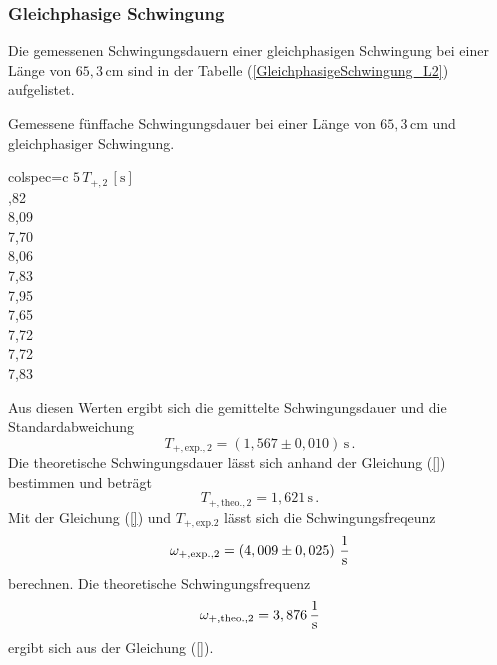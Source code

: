\subsubsection{Gleichphasige Schwingung}
\label{sec:GleichphasigeSchwingung_LangesPendel}
Die gemessenen Schwingungsdauern einer gleichphasigen Schwingung bei einer Länge von $65,3\, \unit{\centi\meter}$ sind in der Tabelle (\ref{GleichphasigeSchwingung_L2})
aufgelistet. 
\begin{table}[H]
  \centering
  \caption{Gemessene fünffache Schwingungsdauer bei einer Länge von $65,3\, \unit{\centi\meter}$ und gleichphasiger Schwingung.}
  \label{tab:GleichphasigeSchwingung_L2}
  \begin{tblr}{colspec={c}}
      \toprule
      $5\, T_{+, 2}\,\left[\unit{\second}\right]$\\
      ,82 \\
      8,09 \\
      7,70 \\
      8,06 \\
      7,83 \\
      7,95 \\
      7,65 \\
      7,72 \\
      7,72 \\
      7,83 \\
      \bottomrule
  \end{tblr}
\end{table}
Aus diesen Werten ergibt sich die gemittelte Schwingungsdauer und die Standardabweichung
$$T_{+,\text{exp.},2} = \left( 1,567 \pm 0,010 \right)\, \unit{\second}\,.$$
Die theoretische Schwingungsdauer lässt sich anhand der Gleichung (\ref{}) bestimmen und beträgt
$$T_{+,\text{theo.},2} = 1,621\, \unit{\second}\,.$$
Mit der Gleichung (\ref{}) und $T_{+,\text{exp.}2}$ lässt sich die Schwingungsfreqeunz
$$\omega_{+,\text{exp.},2} = \left( 4,009 \pm 0,025 \right)\, \unit[per-mode=fraction]{\per\second}$$ berechnen. 
Die theoretische Schwingungsfrequenz
$$\omega_{+,\text{theo.},2} = 3,876 \, \unit[per-mode=fraction]{\per\second}$$ ergibt sich aus der Gleichung (\ref{}).

%
%
